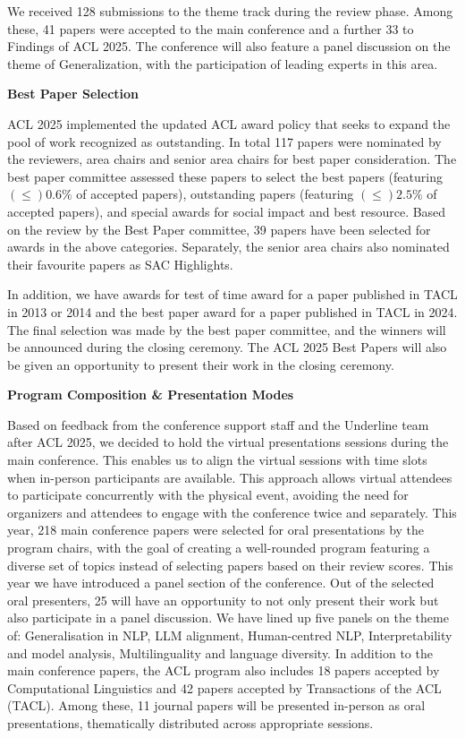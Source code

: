 We received 128 submissions to the theme track during the review phase. Among these, 41 papers were accepted to the main conference and a further 33 to Findings of ACL 2025. The conference will also feature a panel discussion on the theme of Generalization, with the participation of leading experts in this area.

\textbf{Best Paper Selection}

ACL 2025 implemented the updated ACL award policy that seeks to expand the pool
of work recognized as outstanding. In total 117 papers were nominated by the reviewers, area chairs and senior area chairs for best paper consideration. The best paper committee assessed these papers to select the best papers (featuring $(\leq)0.6\%$ of accepted papers), outstanding papers (featuring $(\leq)2.5\%$ of accepted papers), and special awards for social impact and best resource.  Based on the review by the Best Paper committee, 39 papers have been selected for awards in the above categories. Separately, the senior area chairs also nominated their favourite papers as SAC Highlights.

In addition, we have awards for test of time award for a paper published in TACL in 2013 or 2014 and the best paper award for a paper published in TACL in 2024. The final selection was made by the best paper committee, and the winners will be announced during the closing ceremony. The ACL 2025 Best Papers will also be given an opportunity to present their work in the closing ceremony.

\textbf{Program Composition & Presentation Modes}

Based on feedback from the conference support staff and the Underline team after ACL 2025, we decided to hold the virtual presentations sessions during the main conference. This enables us to align the virtual sessions with time slots when in-person participants are available. This approach allows virtual attendees to participate concurrently with the physical event, avoiding the need for organizers and attendees to engage with the conference twice and separately.
This year, 218 main conference papers were selected for oral presentations by the program chairs, with the goal of creating a well-rounded program featuring a diverse set of topics instead of selecting papers based on their review scores. This year we have introduced a panel section of the conference. Out of the selected oral presenters, 25 will have an opportunity to not only present their work but also participate in a panel discussion. We have lined up five panels on the theme of: Generalisation in NLP, LLM alignment, Human-centred NLP, Interpretability and model analysis, Multilinguality and language diversity.
In addition to the main conference papers, the ACL program also includes 18 papers accepted by Computational Linguistics and 42 papers accepted by Transactions of the ACL (TACL). Among these, 11 journal papers will be presented in-person as oral presentations, thematically distributed across appropriate sessions. 

